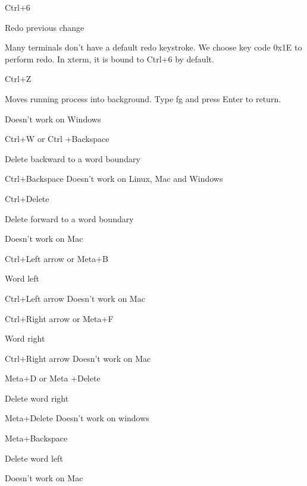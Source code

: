 Ctrl+6

Redo previous change

Many terminals don't have a default redo keystroke. We choose key code
0x1E to perform redo. In xterm, it is bound to Ctrl+6 by default.

Ctrl+Z

Moves running process into background. Type fg and press Enter to
return.

Doesn't work on Windows

Ctrl+W or Ctrl +Backspace

Delete backward to a word boundary

Ctrl+Backspace Doesn't work on Linux, Mac and Windows

Ctrl+Delete

Delete forward to a word boundary

Doesn't work on Mac

Ctrl+Left arrow or Meta+B

Word left

Ctrl+Left arrow Doesn't work on Mac

Ctrl+Right arrow or Meta+F

Word right

Ctrl+Right arrow Doesn't work on Mac

Meta+D or Meta +Delete

Delete word right

Meta+Delete Doesn't work on windows

Meta+Backspace

Delete word left

Doesn't work on Mac
